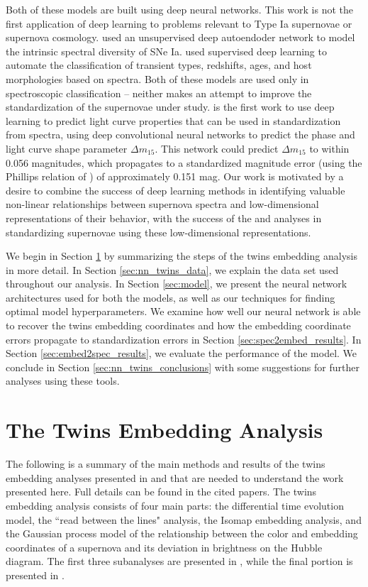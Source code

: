 Both of these models are built using deep neural networks. This work is not the first application of deep learning to problems relevant to Type Ia supernovae or supernova cosmology. \citet{sasdelli_exploring_2016} used an unsupervised deep autoendoder network to model the intrinsic spectral diversity of SNe Ia. \citet{muthukrishna_dash_2019} used supervised deep learning to automate the classification of transient types, redshifts, ages, and host morphologies based on spectra. Both of these models are used only in spectroscopic classification -- neither makes an attempt to improve the standardization of the supernovae under study. \citet{stahl_deepsip_2020} is the first work to use deep learning to predict light curve properties that can be used in standardization from spectra, using deep convolutional neural networks to predict the phase and light curve shape parameter $\Delta m_{15}$. This network could predict $\Delta m_{15}$ to within 0.056 magnitudes, which propagates to a standardized magnitude error (using the Phillips relation of \citet{phillips_absolute_1993}) of approximately 0.151 mag. Our work is motivated by a desire to combine the success of deep learning methods in identifying valuable non-linear relationships between supernova spectra and low-dimensional representations of their behavior, with the success of the  and  analyses in standardizing supernovae using these low-dimensional representations. 

We begin in Section \ref{sec:boone_summary} by summarizing the steps of the twins embedding analysis in more detail. In Section \ref{sec:nn_twins_data}, we explain the data set used throughout our analysis. In Section \ref{sec:model}, we present the neural network architectures used for both the models, as well as our techniques for finding optimal model hyperparameters. We examine how well our neural network is able to recover the twins embedding coordinates and how the embedding coordinate errors propagate to standardization errors in Section \ref{sec:spec2embed_results}. In Section \ref{sec:embed2spec_results}, we evaluate the performance of the \etos{} model. We conclude in Section \ref{sec:nn_twins_conclusions} with some suggestions for further analyses using these tools.

\section{The Twins Embedding Analysis} \label{sec:boone_summary}
The following is a summary of the main methods and results of the twins embedding analyses presented in  and  that are needed to understand the work presented here. Full details can be found in the cited papers. The twins embedding analysis consists of four main parts: the differential time evolution model, the ``read between the lines" analysis, the Isomap embedding analysis, and the Gaussian process model of the relationship between the color and embedding coordinates of a supernova and its deviation in brightness on the Hubble diagram. The first three subanalyses are presented in , while the final portion is presented in .

